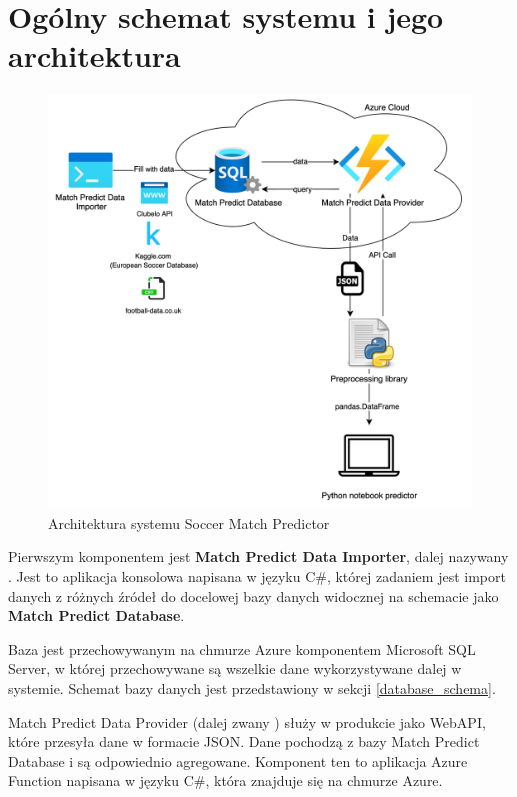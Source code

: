 \section{Ogólny schemat systemu i jego architektura}
\label{arch}
    \begin{figure}[h] 
        \centering\includegraphics[width=\textwidth]{figures/MatchPredictorArchitecture.png}
        \caption{Architektura systemu Soccer Match Predictor}
        \label{fig:arch1}
    \end{figure}
\newpage

\noindent Pierwszym komponentem jest \textbf{Match Predict Data Importer}, dalej nazywany . Jest to aplikacja konsolowa napisana w języku C\#, której zadaniem jest import danych z różnych źródeł do docelowej bazy danych widocznej na schemacie jako \textbf{Match Predict Database}.

Baza jest przechowywanym na chmurze Azure komponentem Microsoft SQL Server, w której przechowywane są wszelkie dane wykorzystywane dalej w systemie. Schemat bazy danych jest przedstawiony w sekcji \ref{database_schema}.

Match Predict Data Provider (dalej zwany ) służy w produkcie jako WebAPI, które przesyła dane w formacie JSON. Dane pochodzą z bazy Match Predict Database i są odpowiednio agregowane. Komponent ten to aplikacja Azure Function napisana w języku C\#, która znajduje się na chmurze Azure.

